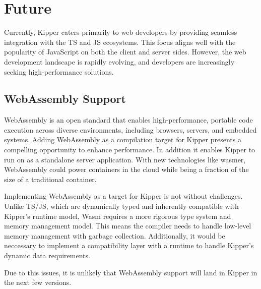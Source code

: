 \section{Future}
\label{sec:future}

Currently, Kipper caters primarily to web developers by providing seamless integration with the TS and JS ecosystems. This focus aligns well with the popularity of JavaScript on both the client and server sides. However, the web development landscape is rapidly evolving, and developers are increasingly seeking high-performance solutions.

\subsection{WebAssembly Support}

WebAssembly is an open standard that enables high-performance, portable code execution across diverse environments, including browsers, servers, and embedded systems. Adding WebAssembly as a compilation target for Kipper presents a compelling opportunity to enhance performance. In addition it enables Kipper to run on as a standalone server application. With new technologies like wasmer, WebAssembly could power containers in the cloud while being a fraction of the size of a traditional container.

Implementing WebAssembly as a target for Kipper is not without challenges. Unlike TS/JS, which are dynamically typed and inherently compatible with Kipper’s runtime model, Wasm requires a more rigorous type system and memory management model. This means the compiler needs to handle low-level memory management with garbage collection. Additionally, it would be neccessary to implement a compatibility layer with a runtime to handle Kipper's dynamic data requirements.

Due to this issues, it is unlikely that WebAssembly support will land in Kipper in the next few versions.

